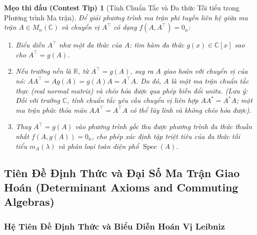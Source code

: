 \documentclass{article}
\newtheorem{tip}{Mẹo thi đấu (Contest Tip)}
\begin{document}
\begin{tip}[Tính Chuẩn Tắc và Đa thức Tối tiểu trong Phương trình Ma trận]
Để giải phương trình ma trận phi tuyến liên hệ giữa ma trận $A \in M_n(\mathbb{C})$ và chuyển vị $A^\top$ có dạng $f(A, A^\top) = 0_n$:
\begin{enumerate}
    \item Biểu diễn $A^\top$ như một đa thức của $A$: tìm hàm đa thức $g(x) \in \mathbb{C}[x]$ sao cho $A^\top = g(A)$.
    \item Nếu trường nền là $\mathbb{R}$, từ $A^\top = g(A)$, suy ra $A$ giao hoán với chuyển vị của nó: $A A^\top = A g(A) = g(A) A = A^\top A$. Do đó, $A$ là một ma trận chuẩn tắc thực (real normal matrix) và chéo hóa được qua phép biến đổi unita. (Lưu ý: Đối với trường $\mathbb{C}$, tính chuẩn tắc yêu cầu chuyển vị liên hợp $A A^* = A^* A$; một ma trận phức thỏa mãn $A A^\top = A^\top A$ có thể lũy linh và không chéo hóa được).
    \item Thay $A^\top = g(A)$ vào phương trình gốc thu được phương trình đa thức thuần nhất $f(A, g(A)) = 0_n$, cho phép xác định tập triệt tiêu của đa thức tối tiểu $m_A(\lambda)$ và phân loại toàn diện phổ $\operatorname{Spec}(A)$.
\end{enumerate}
\end{tip}


\subsection{Tiên Đề Định Thức và Đại Số Ma Trận Giao Hoán (Determinant Axioms and Commuting Algebras)}

\subsubsection*{Hệ Tiên Đề Định Thức và Biểu Diễn Hoán Vị Leibniz}
\end{document}
